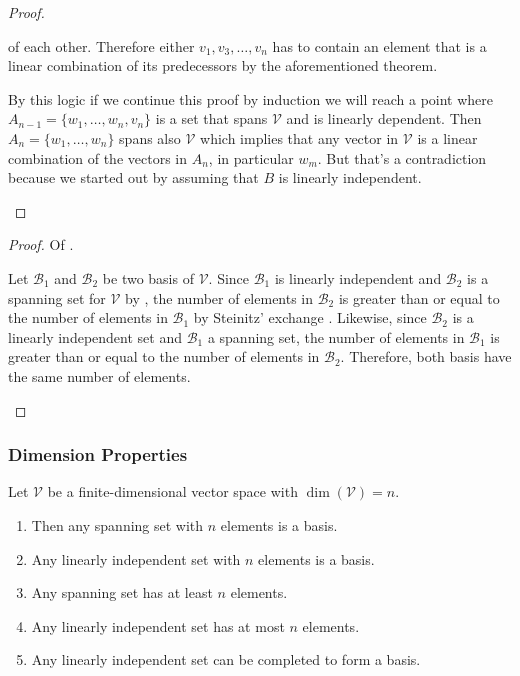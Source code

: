 \begin{proof}
\begin{flushleft}
		of each other. Therefore either $v_1,v_3,\dots,v_n$ has to contain an element
		that is a linear combination of its predecessors by the aforementioned theorem.
	\end{flushleft}
	\begin{flushleft}
		By this logic if we continue this proof by induction we will reach a point
		where $A_{n-1}=\{w_1,\dots,w_n,v_n\}$ is a set that spans $\mathcal{V}$ and is linearly
		dependent. Then $A_n=\{w_1,\dots,w_n\}$ spans also $\mathcal{V}$ which
		implies that any vector in $\mathcal{V}$ is a linear combination of the
		vectors in $A_n$, in particular $w_m$. But that's a contradiction because
		we started out by assuming that $B$ is linearly independent.
	\end{flushleft}
\end{proof}

\begin{proof}
	Of .
	\begin{flushleft}
		Let $\mathcal{B}_1$ and $\mathcal{B}_2$ be two basis of $\mathcal{V}$.
		Since $\mathcal{B}_1$ is linearly independent and $\mathcal{B}_2$ is a
		spanning set for $\mathcal{V}$ by ,
		the number of elements in $\mathcal{B}_2$ is greater than or equal to the
		number of elements in $\mathcal{B}_1$ by Steinitz' exchange
		. Likewise, since $\mathcal{B}_2$ is a
		linearly independent set and $\mathcal{B}_1$ a spanning set, the number
		of elements in $\mathcal{B}_1$ is greater than or equal to the number of
		elements in $\mathcal{B}_2$. Therefore, both basis have the same number
		of elements.
	\end{flushleft}
\end{proof}

\subsubsection{Dimension Properties}\label{subsubsec-dimension-properties}

\begin{thm}\label{thm-dimension-properties}
	Let $\mathcal{V}$ be a finite-dimensional vector space with $\dim(\mathcal{V})=n$.
	\begin{enumerate}
		\item Then any spanning set with $n$ elements is a basis.
		\item Any linearly independent set with $n$ elements is a basis.
		\item Any spanning set has at least $n$ elements.
		\item Any linearly independent set has at most $n$ elements.
		\item Any linearly independent set can be completed to form a basis.
	\end{enumerate}
\end{thm}

